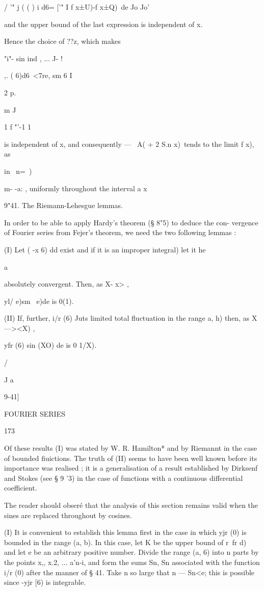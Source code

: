 / '" j ( ( ) i d6= ['" I f x±U)-f x±Q)\ de Jo Jo'

and the upper bound of the last expression is independent of x.

Hence the choice of ??z, which makes

"i"- sin ind , ... J- !

  ,. ( 6)d6\ <7re, sm 6 I

2 p.

m J

1 f "'-1 1

is independent of x, and consequently — \ A( + 2 S.n x)\ tends to the
limit f x), as

in \ n=\ )

m- -a: , uniformly throughout the interval a x%

9"41. The Riemann-Lehesgue lemmas.

In order to be able to apply Hardy's theorem (§ 8"5) to deduce the
con- vergence of Fourier series from Fejer's theorem, we need the two
following lemmas :

(I) Let ( -x 6) dd exist and if it is an improper integral) let it he

  a

absolutely convergent. Then, as X- x> ,

yl/ e)sm \ e)de is 0(1).

(II) If, further, i/r (6) Juts limited total fluctuation in the range
a, h) then, as X—><X) ,

yfr (6) sin (XO) de is 0 1/X).

/

J a

9-41]

FOURIER SERIES

173

Of these results (I) was stated by W. R. Hamilton* and by Riemannt in
the case of bounded fiuictions. The truth of (II) seems to have been
well known before its importance was realised ; it is a generalisation
of a result established by Dirksenf and Stokes (see § 9 '3) in the
case of functions with a continuous differential coefficient.

The reader should obser\'e that the analysis of this section remains
valid when the sines are replaced throughout by cosines.

(I) It is convenient to establish this lemma first in the case in
which yjr (0) is bounded in the range (a, b). In this case, let K be
the upper bound of r\ fr d)\, and let e be an arbitrary positive
number. Divide the range (a, 6) into n parts by the points x,, x.2,
... a'n-i, and form the sums Sn, Sn associated with the function i/r
(0) after the manner of § 41. Take n so large that n — Sn<e; this is
possible since -yjr [6) is integrable.

